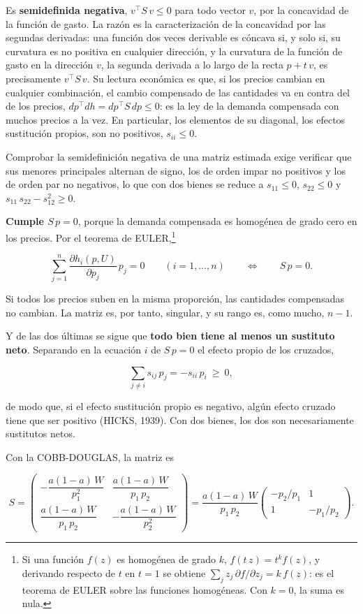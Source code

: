 \documentclass[10pt,a4paper]{article}
\begin{document}
Es \textbf{semidefinida negativa}, $v^{\top}S\,v\le0$ para todo vector $v$, por la concavidad de la función de gasto. La razón es la caracterización de la concavidad por las segundas derivadas: una función dos veces derivable es cóncava si, y solo si, su curvatura es no positiva en cualquier dirección, y la curvatura de la función de gasto en la dirección $v$, la segunda derivada a lo largo de la recta $p+t\,v$, es precisamente $v^{\top}S\,v$. Su lectura económica es que, si los precios cambian en cualquier combinación, el cambio compensado de las cantidades va en contra del de los precios, $dp^{\top}dh=dp^{\top}S\,dp\le0$: es la ley de la demanda compensada con muchos precios a la vez. En particular, los elementos de su diagonal, los efectos sustitución propios, son no positivos, $s_{ii}\le0$.

Comprobar la semidefinición negativa de una matriz estimada exige verificar que sus menores principales alternan de signo, los de orden impar no positivos y los de orden par no negativos, lo que con dos bienes se reduce a $s_{11}\le0$, $s_{22}\le0$ y $s_{11}\,s_{22}-s_{12}^2\ge0$.

\textbf{Cumple $S\,p=0$}, porque la demanda compensada es homogénea de grado cero en los precios. Por el teorema de EULER,\footnote{%
    Si una función $f(z)$ es homogénea de grado $k$, $f(t\,z)=t^kf(z)$, y derivando respecto de $t$ en $t=1$ se obtiene $\sum_jz_j\,\partial f/\partial z_j=k\,f(z)$: es el teorema de EULER sobre las funciones homogéneas. Con $k=0$, la suma es nula.
}

$$\sum_{j=1}^{n}\frac{\partial h_i(p,U)}{\partial p_j}\,p_j=0\qquad(i=1,\dots,n)\qquad\Longleftrightarrow\qquad S\,p=0.$$

Si todos los precios suben en la misma proporción, las cantidades compensadas no cambian. La matriz es, por tanto, singular, y su rango es, como mucho, $n-1$.

Y de las dos últimas se sigue que \textbf{todo bien tiene al menos un sustituto neto}. Separando en la ecuación $i$ de $S\,p=0$ el efecto propio de los cruzados,

$$\sum_{j\ne i}s_{ij}\,p_j=-s_{ii}\,p_i\ \ge\ 0,$$

de modo que, si el efecto sustitución propio es negativo, algún efecto cruzado tiene que ser positivo (HICKS, 1939). Con dos bienes, los dos son necesariamente sustitutos netos.

Con la COBB-DOUGLAS, la matriz es

$$S=\begin{pmatrix}-\dfrac{a(1-a)\,W}{p_1^2} & \dfrac{a(1-a)\,W}{p_1\,p_2}\\[1em] \dfrac{a(1-a)\,W}{p_1\,p_2} & -\dfrac{a(1-a)\,W}{p_2^2}\end{pmatrix}=\frac{a(1-a)\,W}{p_1\,p_2}\begin{pmatrix}-p_2/p_1 & 1\\ 1 & -p_1/p_2\end{pmatrix}.$$
\end{document}
